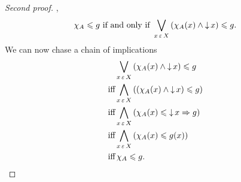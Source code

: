 \documentclass[../main.tex]{subfiles}
\begin{document}
\begin{proof}[Second proof]
  \Omega\),
  \[%
    \chi_A \leq g \text{ if and only if } \bigvee_{x \in X} \pwrap{\chi_A(x)
      \wedge \dset x} \leq g.
  \]%
  We can now chase a chain of implications
  \begin{align*}
    & \bigvee_{x \mathrel{\,\varepsilon\,} X} {\left(\chi_A(x) \wedge \operatorname{\downarrow} x\right)} \leqslant g \\
    \text{iff} & \bigwedge_{x \mathrel{\,\varepsilon\,} X} {\left( {\left(\chi_A(x) \wedge \operatorname{\downarrow} x\right)}
      \leqslant g \right)}\\
    \text{iff} & \bigwedge_{x \mathrel{\,\varepsilon\,} X} {\left(\chi_A(x) \leqslant \operatorname{\downarrow} x \Rightarrow
      g\right)}\\
    \text{iff} & \bigwedge_{x \mathrel{\,\varepsilon\,} X} {\left(\chi_A(x) \leqslant g(x)\right)}\\
    \text{iff} & \,\chi_A \leqslant g.
  \end{align*}
\end{proof}
\end{document}
